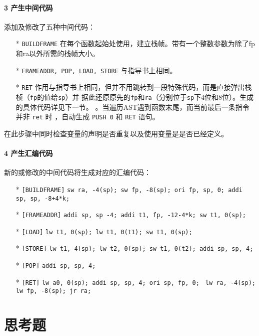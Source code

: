 \documentclass[UTF8]{ctexart}
\newcommand{\T}[1]{\texttt{{#1}}}
\begin{document}
            \paragraph{3 产生中间代码} 添加及修改了五种中间代码：
            \begin{itemize}
                \item[*] \T{BUILDFRAME} 在每个函数起始处使用，建立栈帧。带有一个整数参数为除了fp和ra以外所需的栈帧大小。
                \item[*] \T{FRAMEADDR, POP, LOAD, STORE} 与指导书上相同。
                \item[*] \T{RET} 作用与指导书上相同，但并不用跳转到一段特殊代码，而是直接弹出栈桢（\T{fp}的值给\T{sp}）并
                据此还原原先的\T{fp}和\T{ra}（分别位于\T{sp}下4位和8位）。生成的具体代码详见下一节。
                。当遍历AST遇到函数末尾，而当前最后一条指令并非 \T{ret} 时
                ，自动生成 \T{PUSH 0} 和 \T{RET} 语句。
            \end{itemize}

            在此步骤中同时检查变量的声明是否重复以及使用变量是是否已经定义。

            \paragraph{4 产生汇编代码} 新的或修改的中间代码将生成对应的汇编代码：
            \begin{itemize}
                \item[*] \T{[BUILDFRAME]} \T{sw ra, -4(sp); sw fp, -8(sp); ori fp, sp, 0; addi sp, sp, -8+4*k;}
                \item[*] \T{[FRAMEADDR]} \T{addi sp, sp -4; addi t1, fp, -12-4*k; sw t1, 0(sp);}
                \item[*] \T{[LOAD]} \T{lw t1, 0(sp); lw t1, 0(t1); sw t1, 0(sp);}
                \item[*] \T{[STORE]} \T{lw t1, 4(sp); lw t2, 0(sp); sw t1, 0(t2); addi sp, sp, 4;} 
                \item[*] \T{[POP]} \T{addi sp, sp, 4;} 
                \item[*] \T{[RET]} \T{lw a0, 0(sp); addi sp, sp, 4; ori sp, fp, 0; } 
                \T{lw ra, -4(sp); lw fp, -8(sp); jr ra;} 
            \end{itemize}
        
    \section{思考题}
\end{document}
